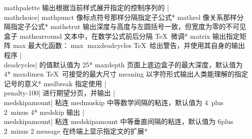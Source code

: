 \capcs mathpalette {输出根据当前样式展开指定的控制序列的 |\\mathchoice|}{}{}
\capcs mathpunct {像标点符号那样分隔指定子公式}*{}
\capcs mathrel {像关系那样分隔指定子公式}*{}
\capcs mathstrut {输出深度与高度与左圆括号一致，但宽度为零的不可见盒子}{}{}
\capcs mathsurround {文本中，在数学公式前后分隔 \TeX\ 微调}*{}
\capcs matrix {输出指定矩阵}{}{}
\capcs max {最大化函数：$\max$}{}{}
\capcs maxdeadcycles {\TeX\ 给出警告，并使用其自身的输出程序 |\\deadcycles| 的值默认值为 25}*{}
\capcs maxdepth {页面上底边盒子的最大深度，默认值为 4\pt}*{}
\capcs maxdimen {\TeX\ 可接受的最大尺寸}{}{}
\capcs meaning {以字符形式输出人类能理解的指定记号的意义}*{}
\capcs medbreak {指定使用 |\\penalty-100| 进行期望分页，并输出 |\\medskipamount| 粘连}{}{}
\capcs medmuskip {中等数学间隔的粘连，默认值为 4\mud\ plus 2\mud\ minus 4\mud}*{}
\capcs medskip {输出 |\\medskipamount| 粘连}{}{}
\capcs medskipamount {中等垂直间隔的粘连，默认值为 6\pt plus 2\pt\ minus 2\pt}{}{}
\capcs message {在终端上显示指定文的扩展}*{}
